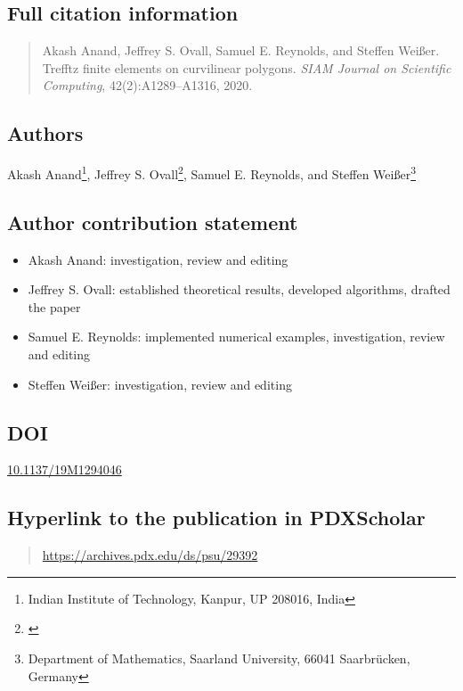 \subsection*{Full citation information}
  \singlespacing
  \begin{quote}
    Akash Anand, Jeffrey S. Ovall, Samuel E. Reynolds, and Steffen Wei\ss{}er.
    Trefftz finite elements on curvilinear polygons.
    \textit{SIAM Journal on Scientific Computing}, 42(2):A1289--A1316, 2020.
  \end{quote}
  \doublespacing

\subsection*{Authors}
  Akash Anand\footnote{Indian Institute of Technology, Kanpur, UP 208016, India},
  Jeffrey S. Ovall\footnote{\label{PSU-affil-2}\PSU},
  Samuel E. Reynolds, and
  Steffen Wei\ss{}er\footnote{Department of Mathematics,
  Saarland University, 66041 Saarbr\"ucken, Germany}

\subsection*{Author contribution statement}
    \singlespacing
    \begin{itemize}
      \item Akash Anand: investigation, review and editing
      \item Jeffrey S. Ovall:  established theoretical results, developed algorithms, drafted the paper
      \item Samuel E. Reynolds: implemented numerical examples, investigation, review and editing
      \item Steffen Wei\ss{}er: investigation, review and editing
    \end{itemize}
    \doublespacing

\subsection*{DOI}
  \href{https://doi.org/10.1137/19M1294046}{10.1137/19M1294046}

\subsection*{Hyperlink to the publication in PDXScholar}
  \begin{quote}
    \url{https://archives.pdx.edu/ds/psu/29392}
  \end{quote}